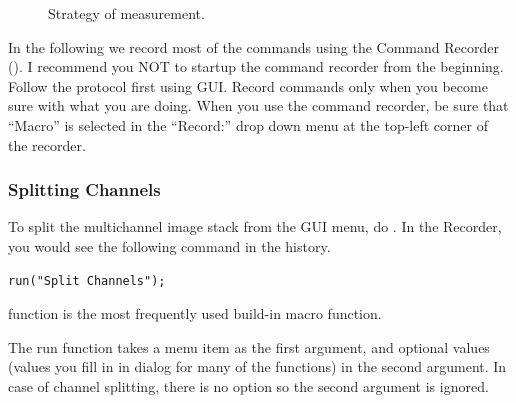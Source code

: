\begin{figure}[h!]
 \quad
 \caption{Strategy of measurement.}
 \label{fig:nucsegProc}
\end{figure}


In the following we record most of the commands using the Command Recorder (). I recommend you NOT to startup the command recorder from the beginning. Follow the protocol first using GUI. Record commands only when you become sure with what you are doing. When you use the command recorder, be sure that ``Macro'' is selected in the ``Record:'' drop down menu at the top-left corner of the recorder.

\subsubsection{Splitting Channels}

To split the multichannel image stack from the GUI menu, do . In the Recorder, you would see the following command in the history. 
\begin{lstlisting}[numbers=none]
run("Split Channels");
\end{lstlisting}

 function is the most frequently used build-in macro function. 


The run function takes a menu item as the first argument, and optional values (values you fill in in dialog for many of the functions) in the second argument. In case of channel splitting, there is no option so the second argument is ignored. 

